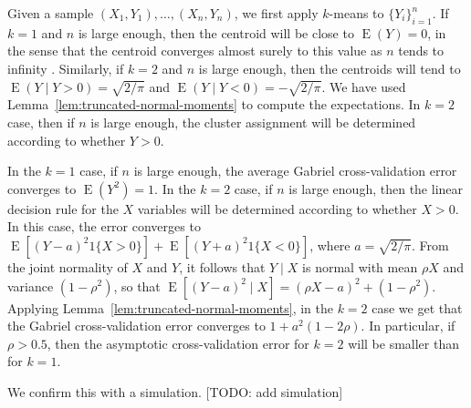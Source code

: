 \documentclass[11pt]{article}
\newcommand{\E}{\operatorname{E}}
\begin{document}
Given a sample $(X_1, Y_1), \dotsc, (X_n, Y_n)$, we first apply $k$-means to
$\{ Y_i \}_{i=1}^{n}$.  If $k = 1$ and $n$ is large enough, then the centroid
will be close to $\E(Y) = 0$, in the sense that the centroid converges almost
surely to this value as $n$ tends to infinity \citep{pollard1981strong}.
Similarly, if $k = 2$ and $n$ is large enough, then the centroids will tend to
$\E(Y \mid Y > 0) = \sqrt{2/\pi}$ and $\E(Y \mid Y < 0) = -\sqrt{2/\pi}$.  We
have used Lemma~\ref{lem:truncated-normal-moments} to compute the
expectations.  In $k = 2$ case, then if $n$ is large enough, the cluster
assignment will be determined according to whether $Y > 0$.

In the $k = 1$ case, if $n$ is large enough, the average Gabriel
cross-validation error converges to $\E(Y^2) = 1$. In the $k = 2$ case, if $n$
is large enough, then the linear decision rule for the $X$ variables will be
determined according to whether $X > 0$.  In this case, the error converges to
$\E[(Y - a)^2 1\{ X > 0\}] + \E[(Y + a)^2 1\{X < 0\}]$, where
$a = \sqrt{2/\pi}$.  From the joint normality of $X$ and $Y$, it follows that $Y
\mid X$ is normal with mean $\rho X$ and variance $(1 - \rho^2)$, so that
$\E[(Y - a)^2 \mid X] = (\rho X - a)^2 + (1 - \rho^2)$.  Applying
Lemma~\ref{lem:truncated-normal-moments}, in the $k = 2$ case we get that
the Gabriel cross-validation error converges to $1 + a^2 (1 - 2 \rho)$.
In particular, if $\rho > 0.5$, then the asymptotic
cross-validation error for $k = 2$ will be smaller than for $k = 1$.

We confirm this with a simulation.  [TODO: add simulation]





\end{document}
